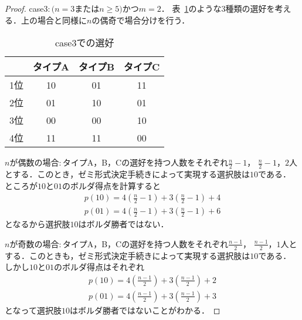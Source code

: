 \documentclass[dvipdfmx]{jsarticle}
\begin{document}
\begin{proof}
  \noindent{}case$3\colon$$(n = 3$または$n \geq 5)$かつ$m = 2$．
  表~\ref{tab:case3}のような$3$種類の選好を考える．上の場合と同様に$n$の偶奇で場合分けを行う．
  \begin{table}[h]
    \caption{case3での選好}\label{tab:case3}
    \begin{center}
      \begin{tabular}{c|c|c|c}\hline
          & タイプA & タイプB & タイプC \\ \hline
        1位 & 10 & 01 & 11 \\
        2位 & 01 & 10 & 01 \\
        3位 & 00 & 00 & 10 \\
        4位 & 11 & 11 & 00 \\ \hline
      \end{tabular}
    \end{center}
  \end{table}

  


\noindent{}$n$が偶数の場合$\colon$タイプA，B，Cの選好を持つ人数をそれぞれ$\frac{n}{2}-1$，
$\frac{n}{2}-1$，$2$人とする．このとき，ゼミ形式決定手続きによって実現する選択肢は$10$である．
ところが$10$と$01$のボルダ得点を計算すると
\begin{gather*}
  p(10) = 4(\frac{n}{2}-1) + 3(\frac{n}{2}-1) + 4 \\
  p(01) = 4(\frac{n}{2}-1) + 3(\frac{n}{2}-1) + 6
\end{gather*}
となるから選択肢$10$はボルダ勝者ではない．

\noindent{}$n$が奇数の場合$\colon$タイプA，B，Cの選好を持つ人数をそれぞれ$\frac{n-1}{2}$，
  $\frac{n-1}{2}$，$1$人とする．このときも，ゼミ形式決定手続きによって実現する選択肢は$10$である．
  しかし$10$と$01$のボルダ得点はそれぞれ
  \begin{gather*}
    p(10) = 4(\frac{n-1}{2}) + 3(\frac{n-1}{2}) + 2 \\
    p(01) = 4(\frac{n-1}{2}) + 3(\frac{n-1}{2}) + 3
  \end{gather*}
  となって選択肢$10$はボルダ勝者ではないことがわかる．


\end{proof}
\end{document}
